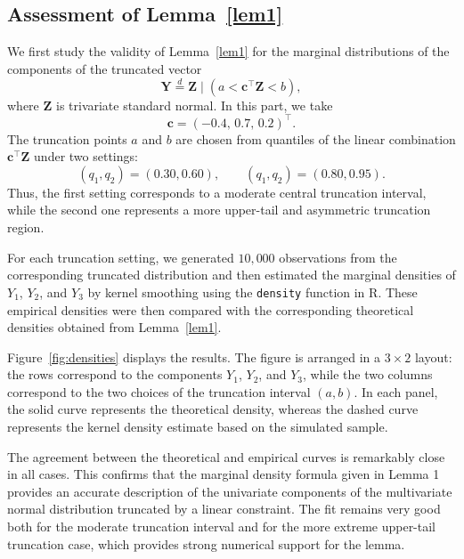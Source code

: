 \documentclass[twoside]{article}
\begin{document}
\subsection{Assessment of Lemma~\ref{lem1}}

We first study the validity of Lemma~\ref{lem1} for the marginal distributions of the
components of the truncated vector
\[
\mathbf{Y} \overset{d}{=} \mathbf{Z}\mid \left(a < \mathbf{c}^\top \mathbf{Z} < b\right),
\]
where \(\mathbf{Z}\) is trivariate standard normal. In this part, we take
\[
\mathbf{c}=(-0.4,\,0.7,\,0.2)^\top.
\]
The truncation points \(a\) and \(b\) are chosen from quantiles of the linear
combination \(\mathbf{c}^\top\mathbf{Z}\) under two settings:
\[
(q_1,q_2)=(0.30,0.60), \qquad (q_1,q_2)=(0.80,0.95).
\]
Thus, the first setting corresponds to a moderate central truncation interval,
while the second one represents a more upper-tail and asymmetric truncation
region.

For each truncation setting, we generated \(10{,}000\) observations from the
corresponding truncated distribution and then estimated the marginal densities
of \(Y_1\), \(Y_2\), and \(Y_3\) by kernel smoothing using the \texttt{density}
function in \textsf{R}. These empirical densities were then compared with the
corresponding theoretical densities obtained from Lemma~\ref{lem1}.

Figure~\ref{fig:densities} displays the results. The figure is arranged in a
\(3\times 2\) layout: the rows correspond to the components \(Y_1\), \(Y_2\),
and \(Y_3\), while the two columns correspond to the two choices of the
truncation interval \((a,b)\). In each panel, the solid curve represents the
theoretical density, whereas the dashed curve represents the kernel density
estimate based on the simulated sample.

The agreement between the theoretical and empirical curves is remarkably close
in all cases. This confirms that the marginal density formula given in Lemma 1
provides an accurate description of the univariate components of the
multivariate normal distribution truncated by a linear constraint. The fit
remains very good both for the moderate truncation interval and for the more
extreme upper-tail truncation case, which provides strong numerical support for
the lemma.
\end{document}
